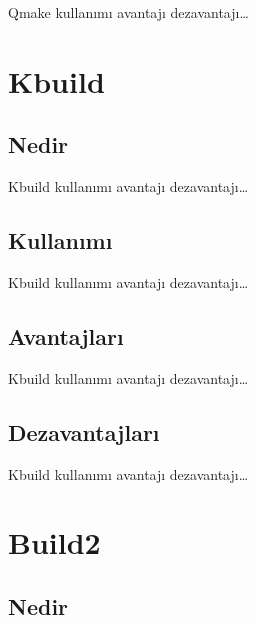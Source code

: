 \documentclass[
]{book}
\begin{document}
Qmake kullanımı avantajı dezavantajı\ldots{}

\hypertarget{kbuild}{%
\chapter*{Kbuild}\label{kbuild}}

\hypertarget{nedir-6}{%
\section*{Nedir}\label{nedir-6}}

Kbuild kullanımı avantajı dezavantajı\ldots{}

\hypertarget{kullanux131mux131-6}{%
\section*{Kullanımı}\label{kullanux131mux131-6}}

Kbuild kullanımı avantajı dezavantajı\ldots{}

\hypertarget{avantajlarux131-6}{%
\section*{Avantajları}\label{avantajlarux131-6}}

Kbuild kullanımı avantajı dezavantajı\ldots{}

\hypertarget{dezavantajlarux131-6}{%
\section*{Dezavantajları}\label{dezavantajlarux131-6}}

Kbuild kullanımı avantajı dezavantajı\ldots{}

\hypertarget{build2}{%
\chapter*{Build2}\label{build2}}

\hypertarget{nedir-7}{%
\section*{Nedir}\label{nedir-7}}
\end{document}
